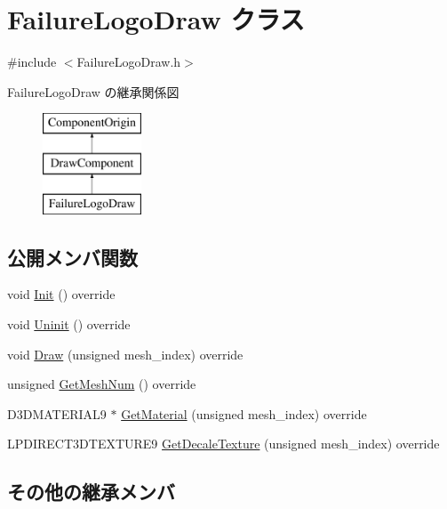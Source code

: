 \hypertarget{class_failure_logo_draw}{}\section{Failure\+Logo\+Draw クラス}
\label{class_failure_logo_draw}


{\ttfamily \#include $<$Failure\+Logo\+Draw.\+h$>$}

Failure\+Logo\+Draw の継承関係図\begin{figure}[H]
\begin{center}
\leavevmode
\includegraphics[height=3.000000cm]{class_failure_logo_draw}
\end{center}
\end{figure}
\subsection*{公開メンバ関数}
\begin{DoxyCompactItemize}
\item 
void \mbox{\hyperlink{class_failure_logo_draw_a718d587edcabb1feea72153a79a65176}{Init}} () override
\item 
void \mbox{\hyperlink{class_failure_logo_draw_a97646253380b54f37565650e211f33cd}{Uninit}} () override
\item 
void \mbox{\hyperlink{class_failure_logo_draw_a9e594c09e4da69134e9f7384cc5f8392}{Draw}} (unsigned mesh\+\_\+index) override
\item 
unsigned \mbox{\hyperlink{class_failure_logo_draw_a169800b9298e3186ef8b4aa82347e38e}{Get\+Mesh\+Num}} () override
\item 
D3\+D\+M\+A\+T\+E\+R\+I\+A\+L9 $\ast$ \mbox{\hyperlink{class_failure_logo_draw_a4fbb4cf8cfd42eeefcdf4fbfa9e52d7a}{Get\+Material}} (unsigned mesh\+\_\+index) override
\item 
L\+P\+D\+I\+R\+E\+C\+T3\+D\+T\+E\+X\+T\+U\+R\+E9 \mbox{\hyperlink{class_failure_logo_draw_aa377e1852cbcda9df1e6d03eaab229c3}{Get\+Decale\+Texture}} (unsigned mesh\+\_\+index) override
\end{DoxyCompactItemize}
\subsection*{その他の継承メンバ}


